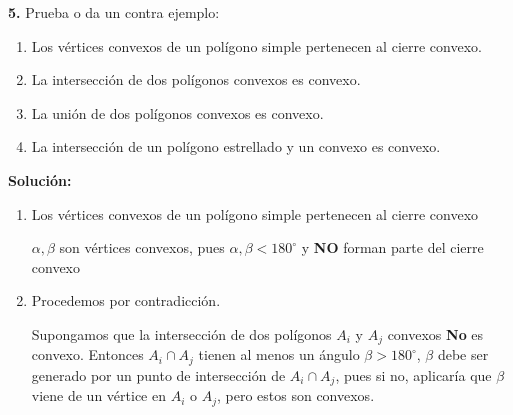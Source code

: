 \textbf{5.} Prueba o da un contra ejemplo:
\begin{enumerate}
\item Los vértices convexos de un polígono simple pertenecen al cierre convexo.
\item La intersección de dos polígonos convexos es convexo.
\item La unión de dos polígonos convexos es convexo.
\item La intersección de un polígono estrellado y un convexo es convexo.
\end{enumerate}
\textbf{Solución:}
\begin{enumerate}
\item Los vértices convexos de un polígono simple pertenecen al cierre convexo\\
  \begin{center}
  \end{center}
  $\alpha, \beta$ son vértices convexos, pues $\alpha, \beta < 180^\circ$ y \textbf{NO} forman parte del cierre convexo
  
\item  Procedemos por contradicción.

  Supongamos que la intersección de dos polígonos $A_i$ y $A_j$ convexos \textbf{No} es convexo.
  Entonces $A_i\cap A_j$ tienen al menos un ángulo $\beta >180^\circ$, $\beta$ debe ser generado
  por un punto de intersección de $A_i\cap A_j$, pues si no, aplicaría que $\beta$ viene de
  un vértice en $A_i$ o $A_j$, pero estos son convexos.


\end{enumerate}
